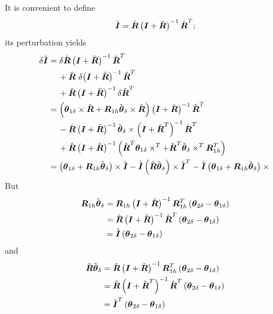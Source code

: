 \documentclass[10pt,dvips,fleqn,subeqn]{report}
\newcommand{\T}[1]{\boldsymbol{#1}}
\begin{document}
It is convenient to define
\begin{equation}
	\hat{\T{I}} =
		\hat{\T{R}} \plbr{\T{I} + \tilde{\T{R}}}^{-1} \hat{\T{R}}^T ;
\end{equation}
its perturbation yields
\begin{align}
	\delta\hat{\T{I}}
	&= \delta\hat{\T{R}} \plbr{\T{I} + \tilde{\T{R}}}^{-1} \hat{\T{R}}^T
	\nonumber \\
	& \mbox{\hspace{12pt}}
	+ \hat{\T{R}} \ \delta\! \plbr{\T{I} + \tilde{\T{R}}}^{-1} \hat{\T{R}}^T
	\nonumber \\
	& \mbox{\hspace{12pt}}
	+ \hat{\T{R}} \plbr{\T{I} + \tilde{\T{R}}}^{-1} \delta\hat{\T{R}}^T \\
	&= \plbr{
		\T{\theta}_{1\delta} \times \hat{\T{R}}
		+ \T{R}_{1h} \tilde{\T{\theta}}_{\delta} \times \tilde{\T{R}}
	} \plbr{\T{I} + \tilde{\T{R}}}^{-1} \hat{\T{R}}^T
	\nonumber \\
	& \mbox{\hspace{12pt}}
	- \hat{\T{R}} \plbr{\T{I} + \tilde{\T{R}}}^{-1}
		\tilde{\T{\theta}}_{\delta} \times
		\plbr{\T{I} + \tilde{\T{R}}^T}^{-1}
		\hat{\T{R}}^T
	\nonumber \\
	& \mbox{\hspace{12pt}}
	+ \hat{\T{R}} \plbr{\T{I} + \tilde{\T{R}}}^{-1} \plbr{
		\hat{\T{R}}^T \T{\theta}_{1\delta} \times^T
		+ \tilde{\T{R}}^T \tilde{\T{\theta}}_{\delta} \times^T \T{R}_{1h}^T
	} \\
	&= \plbr{
		\T{\theta}_{1\delta}
		+ \T{R}_{1h} \tilde{\T{\theta}}_{\delta}
	} \times \hat{\T{I}}
	- \hat{\T{I}} \plbr{\hat{\T{R}} \tilde{\T{\theta}}_{\delta}} \times \hat{\T{I}}^T
	- \hat{\T{I}} \plbr{
		\T{\theta}_{1\delta}
		+ \T{R}_{1h} \tilde{\T{\theta}}_{\delta}
	}\times{}
\end{align}
But
\begin{align}
	\T{R}_{1h} \tilde{\T{\theta}}_{\delta}
	&= \T{R}_{1h} \plbr{\T{I} + \tilde{\T{R}}}^{-1} \T{R}_{1h}^T \plbr{
		\T{\theta}_{2\delta} - \T{\theta}_{1\delta}
	} \\
	&= \hat{\T{R}} \plbr{\T{I} + \tilde{\T{R}}}^{-1} \hat{\T{R}}^T \plbr{
		\T{\theta}_{2\delta} - \T{\theta}_{1\delta}
	} \\
	&= \hat{\T{I}} \plbr{
		\T{\theta}_{2\delta} - \T{\theta}_{1\delta}
	} 
\end{align}
and
\begin{align}
	\hat{\T{R}} \tilde{\T{\theta}}_{\delta}
	&= \hat{\T{R}} \plbr{\T{I} + \tilde{\T{R}}}^{-1} \T{R}_{1h}^T \plbr{
		\T{\theta}_{2\delta} - \T{\theta}_{1\delta}
	} \\
	&= \hat{\T{R}} \plbr{\T{I} + \tilde{\T{R}}^T}^{-1} \hat{\T{R}}^T \plbr{
		\T{\theta}_{2\delta} - \T{\theta}_{1\delta}
	} \\
	&= \hat{\T{I}}^T \plbr{
		\T{\theta}_{2\delta} - \T{\theta}_{1\delta}
	} 
\end{align}
\end{document}
